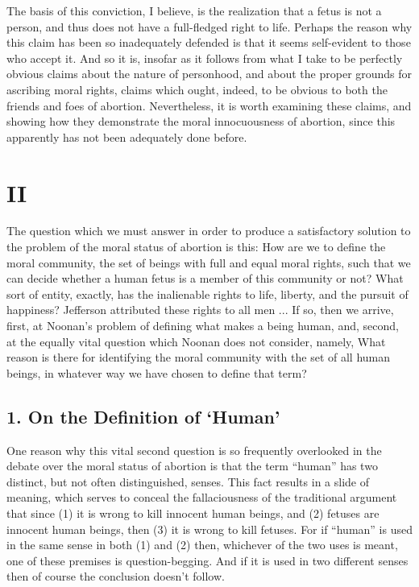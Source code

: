 The basis of this conviction, I believe, is the realization
that a fetus is not a person, and thus does not have a
full-fledged right to life. Perhaps the reason why this
claim has been so inadequately defended is that it seems
self-evident to those who accept it. And so it is, insofar as
it follows from what I take to be perfectly obvious claims
about the nature of personhood, and about the proper
grounds for ascribing moral rights, claims which ought,
indeed, to be obvious to both the friends and foes of
abortion. Nevertheless, it is worth examining these
claims, and showing how they demonstrate the moral
innocuousness of abortion, since this apparently has not
been adequately done before.

\section{II}

The question which we must answer in order to produce a
satisfactory solution to the problem of the moral status of
abortion is this: How are we to define the moral
community, the set of beings with full and equal moral
rights, such that we can decide whether a human fetus is a
member of this community or not? What sort of entity,
exactly, has the inalienable rights to life, liberty, and the
pursuit of happiness? Jefferson attributed these rights to
all men ... If so, then we arrive, first, at Noonan’s
problem of defining what makes a being human, and,
second, at the equally vital question which Noonan does
not consider, namely, What reason is there for identifying
the moral community with the set of all human beings, in
whatever way we have chosen to define that term?

\subsection{1. On the Definition of `Human'}

One reason why this vital second question is so frequently
overlooked in the debate over the moral status of abortion
is that the term ``human” has two distinct, but not often
distinguished, senses. This fact results in a slide of
meaning, which serves to conceal the fallaciousness of the
traditional argument that since (1) it is wrong to kill
innocent human beings, and (2) fetuses are innocent
human beings, then (3) it is wrong to kill fetuses. For if
“human” is used in the same sense in both (1) and (2)
then, whichever of the two uses is meant, one of these
premises is question-begging. And if it is used in two
different senses then of course the conclusion doesn’t
follow.


